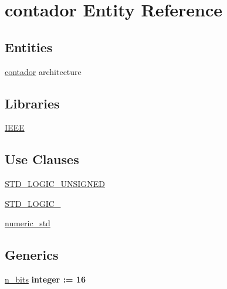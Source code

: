 \hypertarget{classcontador}{}\section{contador Entity Reference}
\label{classcontador}
\subsection*{Entities}
\begin{DoxyCompactItemize}
\item 
\hyperlink{classcontador_1_1contador}{contador} architecture
\end{DoxyCompactItemize}
\subsection*{Libraries}
 \begin{DoxyCompactItemize}
\item 
\hyperlink{classcontador_ae4f03c286607f3181e16b9aa12d0c6d4}{I\+E\+E\+E} 
\end{DoxyCompactItemize}
\subsection*{Use Clauses}
 \begin{DoxyCompactItemize}
\item 
\hyperlink{classcontador_a241c3e72dd8024cc8ae831b1b2aed7db}{S\+T\+D\+\_\+\+L\+O\+G\+I\+C\+\_\+\+U\+N\+S\+I\+G\+N\+E\+D}   
\item 
\hyperlink{classcontador_aa4b2b25246a821511120e3149b003563}{S\+T\+D\+\_\+\+L\+O\+G\+I\+C\+\_}   
\item 
\hyperlink{classcontador_a2edc34402b573437d5f25fa90ba4013e}{numeric\+\_\+std}   
\end{DoxyCompactItemize}
\subsection*{Generics}
 \begin{DoxyCompactItemize}
\item 
\hyperlink{classcontador_a986eb173f34190032418b47b9fc9b457}{n\+\_\+bits} {\bfseries {\bfseries \textcolor{comment}{integer}\textcolor{vhdlchar}{ }\textcolor{vhdlchar}{ }\textcolor{vhdlchar}{\+:}\textcolor{vhdlchar}{=}\textcolor{vhdlchar}{ }\textcolor{vhdlchar}{ } \textcolor{vhdldigit}{16} \textcolor{vhdlchar}{ }}}
\end{DoxyCompactItemize}
